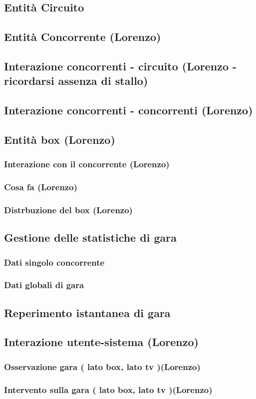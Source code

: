 \label{soluzione_problematiche}
\subsection{Entit\`{a} Circuito}
\subsection{Entit\`{a} Concorrente (Lorenzo)}
\subsection{Interazione concorrenti - circuito (Lorenzo - ricordarsi assenza di stallo)}
\subsection{Interazione concorrenti - concorrenti (Lorenzo)}
\subsection{Entità box (Lorenzo)}
     \subsubsection{Interazione con il concorrente (Lorenzo)}
     \subsubsection{Cosa fa (Lorenzo)}
     \subsubsection{Distrbuzione del box (Lorenzo)}
\subsection{Gestione delle statistiche di gara}
     \subsubsection{Dati singolo concorrente}
     \subsubsection{Dati globali di gara}
\subsection{Reperimento istantanea di gara}
\subsection{Interazione utente-sistema (Lorenzo)}
     \subsubsection{Osservazione gara ( lato box, lato tv )(Lorenzo)}
     \subsubsection{Intervento sulla gara ( lato box, lato tv )(Lorenzo)}